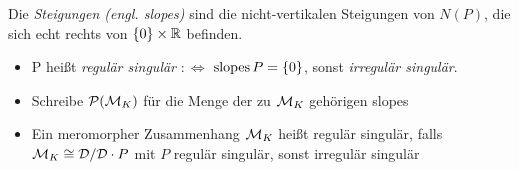 \begin{defn} %
  Die \emph{Steigungen (engl. slopes)} sind die nicht-vertikalen Steigungen von
  $N(P)$, die sich echt rechts von $\{0\}\times\mathbb{R}$ befinden.\\ %
  \begin{itemize}
    \item P heißt \emph{regulär singulär} $:\Leftrightarrow$
      $\operatorname{slopes}{P}=\{0\}$, sonst \emph{irregulär singulär}.

    \item Schreibe $\mathcal{P}(\mathcal{M}_K)$ für die Menge der zu $\mathcal{M}_K$ gehörigen slopes
    \item Ein meromorpher Zusammenhang $\mathcal{M}_K$ heißt regulär singulär, falls
      $\mathcal{M}_K\cong\mathcal{D}/\mathcal{D}\cdot P$ mit $P$ regulär singulär, sonst irregulär
      singulär

  \end{itemize}
\end{defn}


